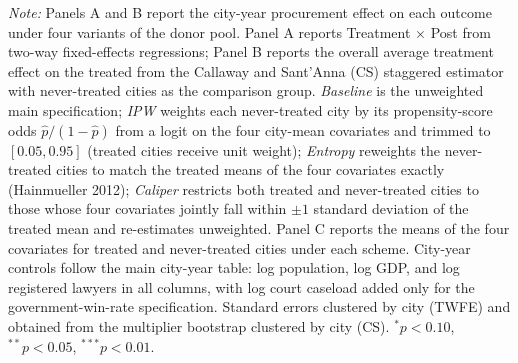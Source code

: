 \begin{table}[!htbp]
\begin{threeparttable}
\begin{tablenotes}[flushleft]
\item \textit{Note:} Panels A and B report the city-year procurement effect on each outcome under four variants of the donor pool. Panel A reports Treatment $\times$ Post from two-way fixed-effects regressions; Panel B reports the overall average treatment effect on the treated from the Callaway and Sant'Anna (CS) staggered estimator with never-treated cities as the comparison group. \textit{Baseline} is the unweighted main specification; \textit{IPW} weights each never-treated city by its propensity-score odds $\hat{p}/(1-\hat{p})$ from a logit on the four city-mean covariates and trimmed to $[0.05, 0.95]$ (treated cities receive unit weight); \textit{Entropy} reweights the never-treated cities to match the treated means of the four covariates exactly (Hainmueller 2012); \textit{Caliper} restricts both treated and never-treated cities to those whose four covariates jointly fall within $\pm 1$ standard deviation of the treated mean and re-estimates unweighted. Panel C reports the means of the four covariates for treated and never-treated cities under each scheme. City-year controls follow the main city-year table: log population, log GDP, and log registered lawyers in all columns, with log court caseload added only for the government-win-rate specification. Standard errors clustered by city (TWFE) and obtained from the multiplier bootstrap clustered by city (CS). $^{*}p<0.10$, $^{**}p<0.05$, $^{***}p<0.01$.
\end{tablenotes}
\end{threeparttable}
\end{table}
